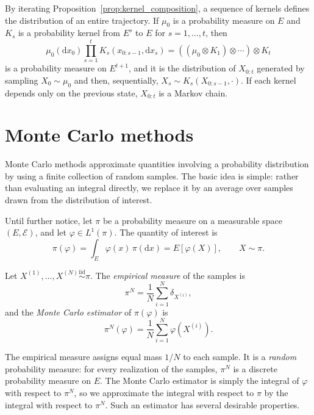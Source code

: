 By iterating Proposition~\ref{prop:kernel_composition}, a sequence of kernels defines the distribution of an entire trajectory. If $\mu_0$ is a probability measure on $E$ and $K_s$ is a probability kernel from $E^{s}$ to $E$ for $s=1,\ldots,t$, then
\begin{equation}
    \mu_0(\mathrm{d}x_0)\prod_{s=1}^{t}K_s(x_{0:s-1},\mathrm{d}x_s) = \left(\left(\mu_0\otimes K_1\right)\otimes\cdots\right)\otimes K_t
    \label{eq:path_measure}
\end{equation}
is a probability measure on $E^{t+1}$, and it is the distribution of $X_{0:t}$ generated by sampling $X_0\sim\mu_0$ and then, sequentially, $X_s\sim K_s(X_{0:s-1},\cdot)$. If each kernel depends only on the previous state, $X_{0:t}$ is a Markov chain.

\section{Monte Carlo methods}
\label{sec:monte_carlo}
Monte Carlo methods approximate quantities involving a probability distribution by using a finite collection of random samples. The basic idea is simple: rather than evaluating an integral directly, we replace it by an average over samples drawn from the distribution of interest.

Until further notice, let $\pi$ be a probability measure on a measurable space $(E,\mathcal{E})$, and let $\varphi\in L^1(\pi)$. The quantity of interest is
\begin{equation}
    \pi(\varphi) = \int_E\varphi(x)\,\pi(\mathrm{d}x) = E[\varphi(X)], \qquad X\sim\pi.
    \label{eq:target_expectation}
\end{equation}

\begin{definition}
    \label{def:empirical_measure}
    Let $X^{(1)},\ldots,X^{(N)}\overset{\mathrm{iid}}{\sim}\pi$. The \emph{empirical measure} of the samples is
    \begin{equation}
        \pi^N = \frac{1}{N}\sum_{i=1}^{N}\delta_{X^{(i)}},
        \label{eq:empirical_measure}
    \end{equation}
    and the \emph{Monte Carlo estimator} of $\pi(\varphi)$ is
    \begin{equation}
        \pi^N(\varphi) = \frac{1}{N}\sum_{i=1}^{N}\varphi(X^{(i)}).
        \label{eq:monte_carlo_estimator}
    \end{equation}
\end{definition}

The empirical measure assigns equal mass $1/N$ to each sample. It is a \emph{random} probability measure: for every realization of the samples, $\pi^N$ is a discrete probability measure on $E$. The Monte Carlo estimator is simply the integral of $\varphi$ with respect to $\pi^N$, so we approximate the integral with respect to $\pi$ by the integral with respect to $\pi^N$. Such an estimator has several desirable properties.

